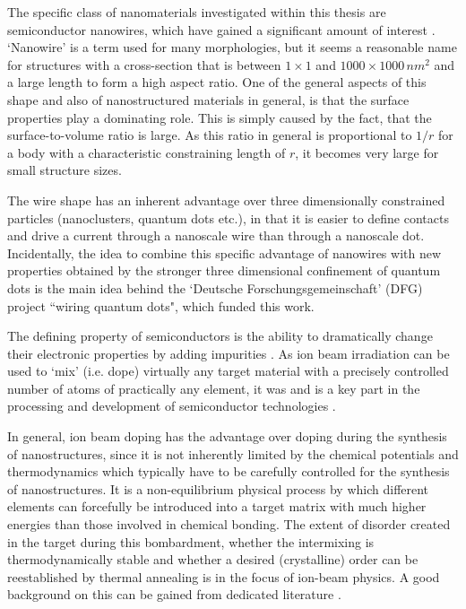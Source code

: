 The specific class of nanomaterials investigated within this thesis are semiconductor nanowires, which have gained a significant amount of  interest \cite{huang_room-temperature_2001,cui_nanowire_2001,duan_indium_2001,xia_one-dimensional_2003,lieber_functional_2007}. `Nanowire' is a term used for many morphologies, but it seems a reasonable name for structures with a cross-section that is between $1 \times 1$ and $1000 \times 1000\,nm^2$ and a large length to form a high aspect ratio. One of the general aspects of this shape and also of nanostructured materials in general, is that the surface properties play a dominating role. This is simply caused by the fact, that the surface-to-volume ratio is large. As this ratio in general is proportional to $1/r$ for a body with a characteristic constraining length of $r$, it becomes very large for small structure sizes.

The wire shape has an inherent advantage over three dimensionally constrained particles (nanoclusters, quantum dots etc.), in that it is easier to define contacts and drive a current through a nanoscale wire than through a nanoscale dot. Incidentally, the idea to combine this specific advantage of nanowires with new properties obtained by the stronger three dimensional confinement of quantum dots is the main idea behind the `Deutsche Forschungsgemeinschaft' (DFG) project ``wiring quantum dots", which funded this work. 

The defining property of semiconductors is the ability to dramatically change their electronic properties by adding impurities \cite{sze_physics_2006}. As ion beam irradiation can be used to `mix' (i.e. dope) virtually any target material with a precisely controlled number of atoms of practically any element, it was and is a key part in the processing and development of semiconductor technologies \cite{hamm_industrial_2012}. 

In general, ion beam doping has the advantage over doping during the synthesis of nanostructures, since it is not inherently limited by the chemical potentials and thermodynamics which typically have to be carefully controlled for the synthesis of nanostructures. It is a non-equilibrium physical process by which different elements can forcefully be introduced into a target matrix with much higher energies than those involved in chemical bonding. The extent of disorder created in the target during this bombardment, whether the intermixing is thermodynamically stable and whether a desired (crystalline) order can be reestablished by thermal annealing is in the focus of ion-beam physics. A good background on this can be gained from dedicated literature \cite{ziegler_stopping_1985,eckstein_computer_1991,nastasi/mayer/hirvonen_ion-solid_2008,schmidt_ion_2012}.

